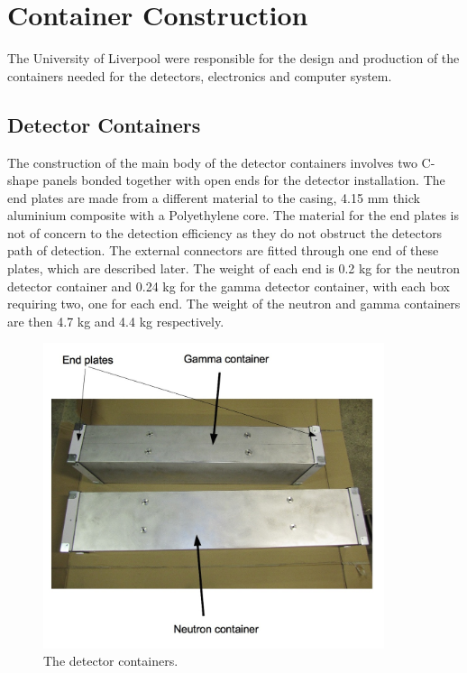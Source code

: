 \section{Container Construction}
The University of Liverpool were responsible for the design and production of the containers needed for the detectors, electronics and computer system. 
\subsection{Detector Containers}
The construction of the main body of the detector containers involves two C-shape panels bonded together with open ends for the detector installation. The end plates are made from a different material to the casing, 4.15 mm thick aluminium composite with a Polyethylene core. The material for the end plates is not of concern to the detection efficiency as they do not obstruct the detectors path of detection. The external connectors are fitted through one end of these plates, which are described later. The weight of each end is 0.2 kg for the neutron detector container and 0.24 kg for the gamma detector container, with each box requiring two, one for each end. The weight of the neutron and gamma containers are then 4.7 kg and 4.4 kg respectively. 

\begin{figure}[htbp]
\begin{center}
\includegraphics[width=100mm]{Chapter6/figures/detectorContainers.jpg}
\caption{The detector containers.}
\label{fig:detectorContainers}
\end{center}
\end{figure}

